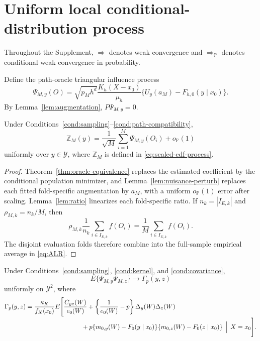 \section{Uniform local conditional-distribution process}
\label{sec:supp-process}

Throughout the Supplement, \(\Rightarrow\) denotes weak convergence and \(\Rightarrow_{\mathbb P}\) denotes conditional weak convergence in probability.

Define the path-oracle triangular influence process
\begin{equation}
\Psi_{M,y}(O)
=
\sqrt{p_Mh^d}
\frac{K_h(X-x_0)}{\mu_h}
\{U_y(a_M)-F_{h,0}(y\mid x_0)\}.
\label{eq:oracle-process}
\end{equation}
By Lemma~\ref{lem:augmentation}, \(P\Psi_{M,y}=0\).

\begin{lemma}
\label{lem:ALR}
Under Conditions~\ref{cond:sampling}--\ref{cond:path-compatibility},
\begin{equation}
\mathbb Z_M(y)
=
\frac1{\sqrt M}
\sum_{i=1}^M\Psi_{M,y}(O_i)
+o_{\mathbb P}(1)
\label{eq:ALR}
\end{equation}
uniformly over \(y\in\mathcal Y\), where \(\mathbb Z_M\) is defined in \eqref{eq:scaled-cdf-process}.
\end{lemma}

\begin{proof}
Theorem~\ref{thm:oracle-equivalence} replaces the estimated coefficient by the conditional population minimizer, and Lemma~\ref{lem:nuisance-perturb} replaces each fitted fold-specific augmentation by \(a_M\), with a uniform \(o_{\mathbb P}(1)\) error after scaling. Lemma~\ref{lem:ratio} linearizes each fold-specific ratio. If \(n_k=|I_{E,k}|\) and \(\rho_{M,k}=n_k/M\), then
\[
\rho_{M,k}\frac1{n_k}\sum_{i\in I_{E,k}}f(O_i)
=
\frac1M\sum_{i\in I_{E,k}}f(O_i).
\]
The disjoint evaluation folds therefore combine into the full-sample empirical average in \eqref{eq:ALR}.
\end{proof}

\begin{lemma}
\label{lem:covariance-limit}
Under Conditions~\ref{cond:sampling}, \ref{cond:kernel}, and \ref{cond:covariance},
\[
E\{\Psi_{M,y}\Psi_{M,z}\}
\to\Gamma_p(y,z)
\]
uniformly on \(\mathcal Y^2\), where
\begin{align}
\Gamma_p(y,z)
&=
\frac{\kappa_K}{f_X(x_0)}
E\Bigg[
\frac{C_{yz}(W)}{e_0(W)}
+
\left\{\frac1{e_0(W)}-p\right\}
\Delta_y(W)\Delta_z(W)
\nonumber\\[-2pt]
&\hspace{31mm}
+
p\{m_{0,y}(W)-F_0(y\mid x_0)\}
  \{m_{0,z}(W)-F_0(z\mid x_0)\}
\,\Bigm|\,X=x_0
\Bigg].
\label{eq:gamma-proof}
\end{align}
\end{lemma}

